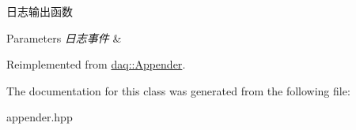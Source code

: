 日志输出函数 


\begin{DoxyParams}{Parameters}
{\em 日志事件} & \\
\hline
\end{DoxyParams}


Reimplemented from \hyperlink{classdaq_1_1Appender_a66e8f896daf7ad4a82769949b351b994}{daq\+::\+Appender}.



The documentation for this class was generated from the following file\+:\begin{DoxyCompactItemize}
\item 
appender.\+hpp\end{DoxyCompactItemize}
